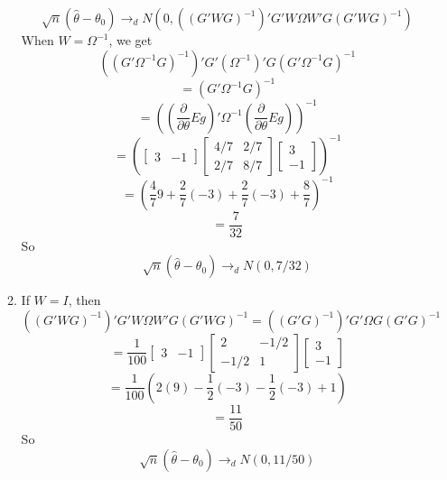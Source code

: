 \documentclass[10pt,letter]{article}
\begin{document}
\begin{enumerate}[label=(\alph*)]
\begin{enumerate}[label=(\roman*)]
\[\sqrt{n}(\hat{\theta} - \theta_0) \to_d N(0, ((G'WG)^{-1})'G'W\Omega W'G (G'WG)^{-1}) \]
When $W = \Omega^{-1}$, we get
\[ ((G'\Omega^{-1} G)^{-1})'G'(\Omega^{-1})'G (G'\Omega^{-1}G)^{-1} \]
\[ = (G'\Omega^{-1}G)^{-1} \]
\[ = \left(\left(\frac{\partial}{\partial \theta}Eg\right)'\Omega^{-1}\left(\frac{\partial}{\partial \theta}Eg\right)\right)^{-1} \]
\[ = \left(\begin{bmatrix}3 & -1 \end{bmatrix}\begin{bmatrix} 4/7 &  2/7 \\ 2/7 & 8/7 \end{bmatrix} \begin{bmatrix}3 \\ -1 \end{bmatrix}\right)^{-1} \]
\[ = \left(\frac{4}{7}9 + \frac{2}{7}(-3) + \frac{2}{7}(-3) + \frac{8}{7} \right)^{-1} \]
\[ = \frac{7}{32} \]
So
\[\sqrt{n}(\hat{\theta} - \theta_0) \to_d N(0, 7/32) \]

\item If $W = I$, then
\[((G'WG)^{-1})'G'W\Omega W'G (G'WG)^{-1} = ((G'G)^{-1})'G'\Omega G (G'G)^{-1} \]
\[ = \frac{1}{100} \begin{bmatrix}3 & -1 \end{bmatrix}\begin{bmatrix} 2 &  - 1/2 \\ - 1/2 & 1 \end{bmatrix} \begin{bmatrix}3 \\ -1 \end{bmatrix} \]
\[ = \frac{1}{100} \left(2(9) - \frac{1}{2}(-3)- \frac{1}{2}(-3) + 1  \right) \]
\[ = \frac{11}{50} \]
So
\[\sqrt{n}(\hat{\theta} - \theta_0) \to_d N(0, 11/50) \]
\end{enumerate}
\end{enumerate}
\end{document}

